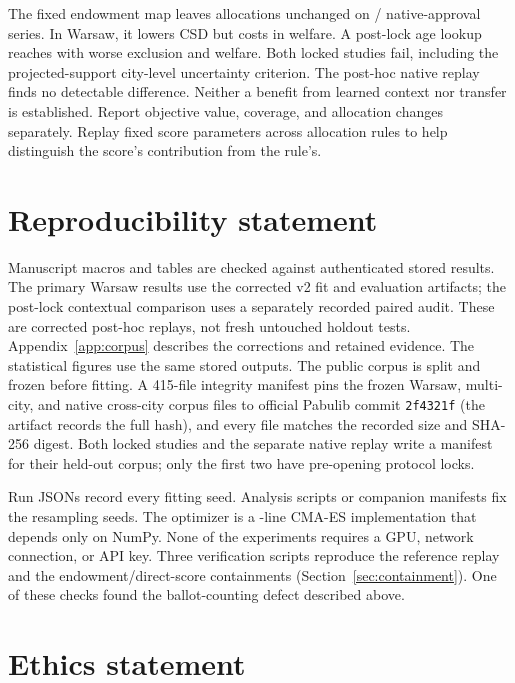 \documentclass{article}
\begin{document}
The fixed endowment map leaves allocations unchanged on
\CrossCityInertN{}/\CrossCitySeriesN{} native-approval series. In Warsaw, it lowers CSD but costs \EndowWelfareCostPct{}
in welfare. A post-lock age lookup reaches \AgeLookupCSD{} with worse exclusion
and welfare. Both locked studies fail, including the projected-support
city-level uncertainty criterion. The post-hoc native replay finds no
detectable difference. Neither a benefit from learned context nor transfer is
established. Report objective value, coverage, and allocation changes
separately. Replay fixed score parameters across allocation rules to help
distinguish the score's contribution from the rule's.

\newpage
\section*{Reproducibility statement}

Manuscript macros and tables are checked against authenticated stored results.
The primary Warsaw results use the corrected v2 fit and evaluation artifacts;
the post-lock contextual comparison uses a separately recorded paired audit.
These are corrected post-hoc replays, not fresh untouched holdout tests.
Appendix~\ref{app:corpus} describes the corrections and retained evidence.
The statistical figures use the same stored outputs. The public corpus
\citep{stolicki2020pabulib} is split and frozen before
fitting. A 415-file integrity manifest pins the frozen Warsaw, multi-city, and
native cross-city corpus files to official Pabulib commit \texttt{2f4321f}
(the artifact records the full hash), and every file matches the recorded size
and SHA-256 digest. Both locked studies and the separate native replay write a
manifest for their held-out corpus; only the first two have pre-opening
protocol locks.

Run JSONs record every fitting seed. Analysis scripts or companion manifests
fix the resampling seeds. The optimizer is a \OptimizerLines{}-line CMA-ES
implementation that depends only on NumPy. None of the experiments requires a
GPU, network connection, or API key. Three verification scripts reproduce the
reference replay and the endowment/direct-score containments
(Section~\ref{sec:containment}). One of these checks found the ballot-counting
defect described above.

\section*{Ethics statement}
\end{document}
